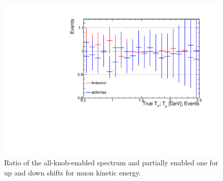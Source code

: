 \documentclass[12pt,a4paper,final]{iopart}
\begin{document}
\begin{figure}[h]
  \centering
  \includegraphics[width=.9\textwidth]{figures/t_muke_ratio.pdf}
  \caption{Ratio of the all-knob-enabled spectrum and partially enabled one for up and down shifts for muon kinetic energy.}
  \label{fig:ratio_muke}
\end{figure}
\end{document}
